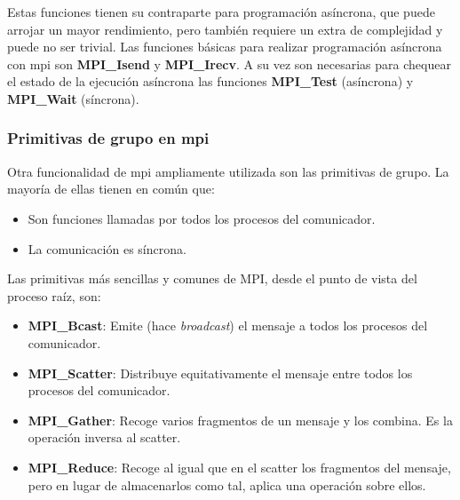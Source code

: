 Estas funciones tienen su contraparte para programación asíncrona, que puede arrojar un mayor rendimiento, pero también requiere un extra de complejidad y puede no ser trivial. Las funciones básicas para realizar programación asíncrona con \acrshort{mpi} son \textbf{MPI\_Isend} y \textbf{MPI\_Irecv}. A su vez son necesarias para chequear el estado de la ejecución asíncrona las funciones \textbf{MPI\_Test} (asíncrona) y \textbf{MPI\_Wait} (síncrona).

\subsubsection{Primitivas de grupo en \acrshort{mpi}}
Otra funcionalidad de \acrshort{mpi} ampliamente utilizada son las primitivas de grupo. La mayoría de ellas tienen en común que:
\begin{itemize}
  \item Son funciones llamadas por todos los procesos del comunicador.
  \item La comunicación es síncrona.
\end{itemize}

Las primitivas más sencillas y comunes de MPI, desde el punto de vista del proceso raíz, son:
\begin{itemize}
  \item \textbf{MPI\_Bcast}: Emite (hace \textit{broadcast}) el mensaje a todos los procesos del comunicador.
  \item \textbf{MPI\_Scatter}: Distribuye equitativamente el mensaje entre todos los procesos del comunicador.
  \item \textbf{MPI\_Gather}: Recoge varios fragmentos de un mensaje y los combina. Es la operación inversa al scatter.
  \item \textbf{MPI\_Reduce}: Recoge al igual que en el scatter los fragmentos del mensaje, pero en lugar de almacenarlos como tal, aplica una operación sobre ellos.
\end{itemize}

